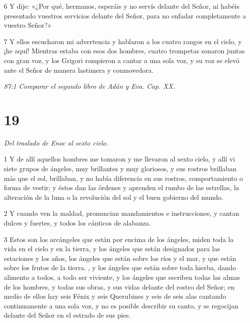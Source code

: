 \par 6 Y dije: «¿Por qué, hermanos, esperáis y no servís delante del Señor, ni habéis presentado vuestros servicios delante del Señor, para no enfadar completamente a vuestro Señor?»

\par 7 Y ellos escucharon mi advertencia y hablaron a los cuatro rangos en el cielo, y ¡he aquí! Mientras estaba con esos dos hombres, cuatro trompetas sonaron juntas con gran voz, y los Grigori rompieron a cantar a una sola voz, y su voz se elevó ante el Señor de manera lastimera y conmovedora.

\par \textit{87:1 Comparar el segundo libro de Adán y Eva. Cap. XX.}

\chapter{19}

\par \textit{Del traslado de Enoc al sexto cielo.}

\par 1 Y de allí aquellos hombres me tomaron y me llevaron al sexto cielo, y allí vi siete grupos de ángeles, muy brillantes y muy gloriosos, y sus rostros brillaban más que el sol, brillaban, y no había diferencia en sus rostros, comportamiento o forma de vestir; y éstos dan las órdenes y aprenden el rumbo de las estrellas, la alteración de la luna o la revolución del sol y el buen gobierno del mundo.

\par 2 Y cuando ven la maldad, pronuncian mandamientos e instrucciones, y cantan dulces y fuertes, y todos los cánticos de alabanza.

\par 3 Estos son los arcángeles que están por encima de los ángeles, miden toda la vida en el cielo y en la tierra, y los ángeles que están designados para las estaciones y los años, los ángeles que están sobre los ríos y el mar, y que están sobre los frutos de la tierra. , y los ángeles que están sobre toda hierba, dando alimento a todos, a todo ser viviente, y los ángeles que escriben todas las almas de los hombres, y todas sus obras, y sus vidas delante del rostro del Señor; en medio de ellos hay seis Fénix y seis Querubines y seis de seis alas cantando continuamente a una sola voz, y no es posible describir su canto, y se regocijan delante del Señor en el estrado de sus pies.

